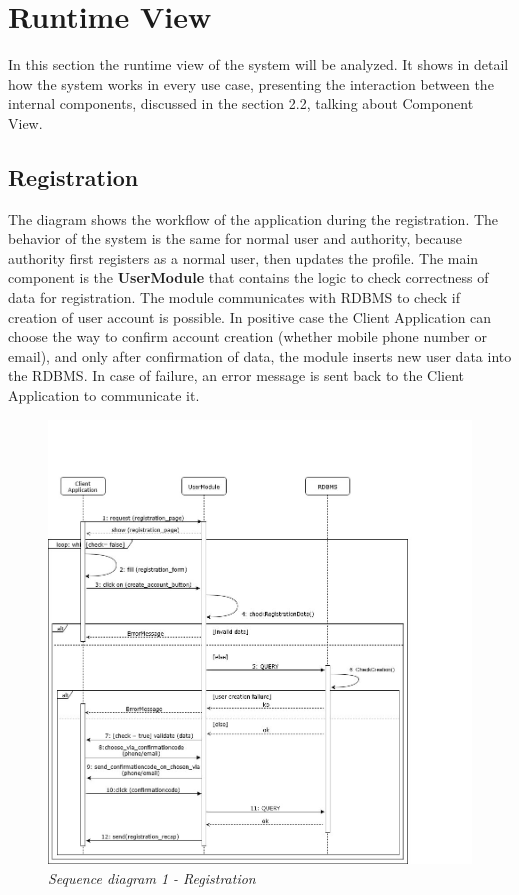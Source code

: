 \section{Runtime View}
In this section the runtime view of the system will be analyzed. It shows in detail how the system works in every use case, 
presenting the interaction between the internal components, discussed in the section 2.2, talking about Component View.

\subsection{Registration}
The diagram shows the workflow of the application during the registration. The behavior of 
the system is the same for normal user and authority, because authority first registers as a normal user, then updates the profile. The main 
component is the \textbf{UserModule} that contains the logic to check correctness of data for registration. The module communicates with RDBMS
to check if creation of user account is possible. In positive case the Client Application can choose the way to confirm account creation (whether
mobile phone number or email), and only after confirmation of data, the module inserts new user data into the RDBMS. In case of failure, an error 
message is sent back to the Client Application to communicate it. 

\begin{figure}[H]
  \centering
  \includegraphics[width=\textwidth]{DD_Images/RunTimeView/1.jpg}
  \caption{\textit{Sequence diagram 1 - Registration}}
\end{figure}

